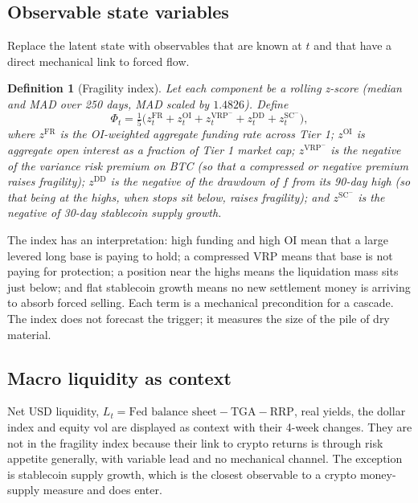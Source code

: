 \documentclass[11pt,a4paper]{article}
\newtheorem{definition}{Definition}[section]
\theoremstyle{definition}
\begin{document}
\subsection{Observable state variables}

Replace the latent state with observables that are known at $t$ and that have a direct mechanical link to forced flow.

\begin{definition}[Fragility index]\label{def:fragility}
Let each component be a rolling z-score (median and MAD over 250 days, MAD scaled by $1.4826$). Define
\begin{equation}
\Phi_t = \tfrac{1}{5}\Big( z^{\mathrm{FR}}_t + z^{\mathrm{OI}}_t + z^{\mathrm{VRP}^{-}}_t + z^{\mathrm{DD}}_t + z^{\mathrm{SC}^{-}}_t \Big),
\end{equation}
where $z^{\mathrm{FR}}$ is the OI-weighted aggregate funding rate across Tier 1; $z^{\mathrm{OI}}$ is aggregate open interest as a fraction of Tier 1 market cap; $z^{\mathrm{VRP}^{-}}$ is the negative of the variance risk premium on BTC (so that a compressed or negative premium raises fragility); $z^{\mathrm{DD}}$ is the negative of the drawdown of $f$ from its 90-day high (so that being at the highs, when stops sit below, raises fragility); and $z^{\mathrm{SC}^{-}}$ is the negative of 30-day stablecoin supply growth.
\end{definition}
The index has an interpretation: high funding and high OI mean that a large levered long base is paying to hold; a compressed VRP means that base is not paying for protection; a position near the highs means the liquidation mass sits just below; and flat stablecoin growth means no new settlement money is arriving to absorb forced selling. Each term is a mechanical precondition for a cascade. The index does not forecast the trigger; it measures the size of the pile of dry material.

\subsection{Macro liquidity as context}

Net USD liquidity, $L_t = \text{Fed balance sheet} - \text{TGA} - \text{RRP}$, real yields, the dollar index and equity vol are displayed as context with their 4-week changes. They are not in the fragility index because their link to crypto returns is through risk appetite generally, with variable lead and no mechanical channel. The exception is stablecoin supply growth, which is the closest observable to a crypto money-supply measure and does enter.
\end{document}
